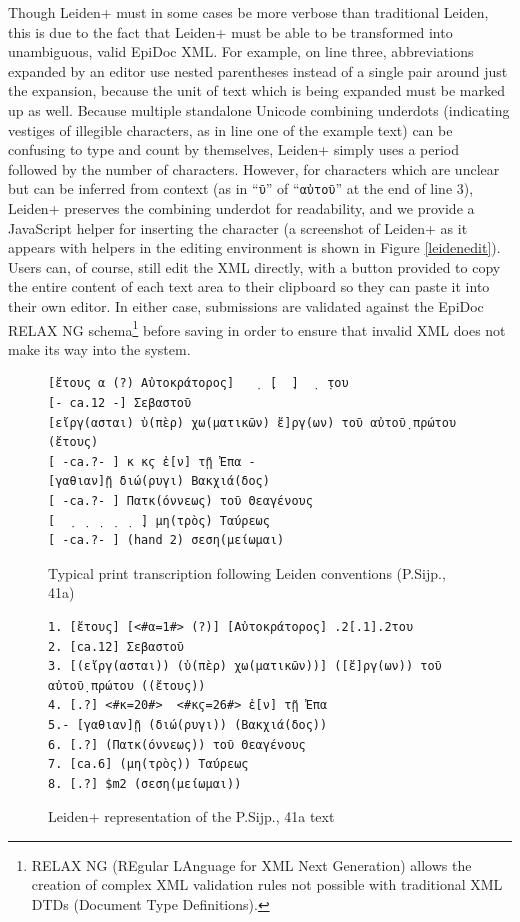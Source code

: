 \documentclass[]{article}
\begin{document}
Though Leiden+ must in some cases be more verbose than traditional Leiden, this is due to the fact that Leiden+ must be able to be transformed into unambiguous, valid EpiDoc XML. For example, on line three, abbreviations expanded by an editor use nested parentheses instead of a single pair around just the expansion, because the unit of text which is being expanded must be marked up as well. Because multiple standalone Unicode combining underdots (indicating vestiges of illegible characters, as in line one of the example text) can be confusing to type and count by themselves, Leiden+ simply uses a period followed by the number of characters. However, for characters which are unclear but can be inferred from context (as in “\texttt{ῦ}” of
“\texttt{αὐτοῦ}”
at the end of line 3), Leiden+ preserves the combining underdot for readability, and we provide a JavaScript helper for inserting the character (a screenshot of Leiden+ as it appears with helpers in the editing environment is shown in Figure \ref{leidenedit}). Users can, of course, still edit the XML directly, with a button provided to copy the entire content of each text area to their clipboard so they can paste it into their own editor. In either case, submissions are validated against the EpiDoc RELAX NG schema\footnote{RELAX NG (REgular LAnguage for XML Next Generation) allows the creation of complex XML validation rules not possible with traditional XML DTDs (Document Type Definitions).} before saving in order to ensure that invalid XML does not make its way into the system.

\begin{figure}[!hbt]
    \begin{verbatim}
[ἔτους α (?) Αὐτοκράτορος]   ̣  ̣[  ̣]  ̣  ̣του 
[- ca.12 -] Σεβαστοῦ 
[εἴργ(ασται) ὑ(πὲρ) χω(ματικῶν) ἔ]ργ(ων) τοῦ αὐτοῦ̣ πρώτου (ἔτους) 
[ -ca.?- ] κ κϛ ἐ[ν] τῇ Ἐπα -
[γαθιαν]ῇ διώ(ρυγι) Βακχιά(δος) 
[ -ca.?- ] Πατκ(όννεως) τοῦ Θεαγένους 
[  ̣  ̣  ̣  ̣  ̣  ̣] μη(τρὸς) Ταύρεως 
[ -ca.?- ] (hand 2) σεση(μείωμαι)
    \end{verbatim}
    \caption{Typical print transcription following Leiden conventions (P.Sijp., 41a)\label{leiden}}
\end{figure}\nocite{psijp}

\begin{figure}[!hbt]
    \begin{verbatim}
1. [ἔτους] [<#α=1#> (?)] [Αὐτοκράτορος] .2[.1].2του
2. [ca.12] Σεβαστοῦ
3. [(εἴργ(ασται)) (ὑ(πὲρ) χω(ματικῶν))] ([ἔ]ργ(ων)) τοῦ αὐτοῦ̣ πρώτου ((ἔτους))
4. [.?] <#κ=20#>  <#κϛ=26#> ἐ[ν] τῇ Ἐπα
5.- [γαθιαν]ῇ (διώ(ρυγι)) (Βακχιά(δος))
6. [.?] (Πατκ(όννεως)) τοῦ Θεαγένους
7. [ca.6] (μη(τρὸς)) Ταύρεως
8. [.?] $m2 (σεση(μείωμαι))
    \end{verbatim}
    \caption{Leiden+ representation of the P.Sijp., 41a text\label{leidenp}}
\end{figure}
\end{document}
